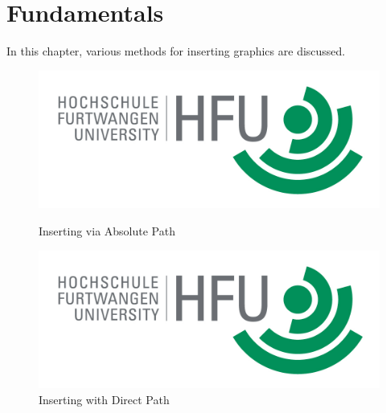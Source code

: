 \chapter{Fundamentals}

In this chapter, various methods for inserting graphics are discussed. 

\begin{figure}
    \caption{Inserting via Absolute Path} %
    \includegraphics[width=1\textwidth]{content/pictures/hfu}
    \label{pic:bild3}
\end{figure}

\begin{figure}
    \centering
    \includegraphics[width=13cm]{content/pictures/hfu.jpg}
    \caption{Inserting with Direct Path} %
    \label{La12bel}
\end{figure}
